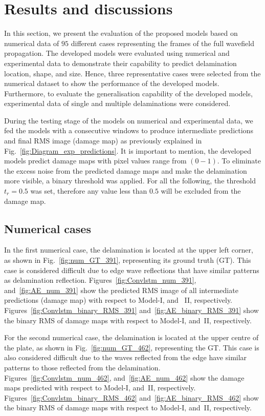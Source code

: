 \section{Results and discussions}
\begin{sloppypar}
	In this section, we present the evaluation of the proposed models based on numerical data of \(95\) different cases representing the frames of the full wavefield propagation. 
	The developed models were evaluated using numerical and experimental data to demonstrate their capability to predict delamination location, shape, and size.	
	Hence, three representative cases were selected from the numerical dataset to show the performance of the developed models.
	Furthermore, to evaluate the generalisation capability of the developed models, experimental data of single and multiple delaminations were considered.
	
	During the testing stage of the models on numerical and experimental data, we fed the models with a consecutive windows to produce intermediate predictions and final RMS image (damage map) as previously explained in Fig.~\ref{fig:Diagram_exp_predictions}.
	It is important to mention, the developed models predict damage maps with pixel values range from \((0-1)\).
	To eliminate the excess noise from the predicted damage maps and make the delamination more visible, a binary threshold was applied.
	For all the following, the threshold $t_r=0.5$ was set, therefore any value less than $0.5$ will be excluded from the damage map.
	
	\subsection{Numerical cases}
	In the first numerical case, the delamination is located at the upper left corner, as shown in Fig.~\ref{fig:num_GT_391}, representing its ground truth (GT).
	This case is considered difficult due to edge wave reflections that have similar patterns as delamination reflection.
	Figures~\ref{fig:Convlstm_num_391}, and~\ref{fig:AE_num_391} show the predicted RMS image of all intermediate predictions (damage map) with respect to Model-I, and~ II, respectively.
	Figures~\ref{fig:Convlstm_binary_RMS_391} and~\ref{fig:AE_binary_RMS_391} show the binary RMS of damage maps with respect to Model-I, and~II, respectively.
	
	For the second numerical case, the delamination is located at the upper centre of the plate, as shown in Fig.~\ref{fig:num_GT_462}, representing the GT.
	This case is also considered difficult due to the waves reflected from the edge have similar patterns to those reflected from the delamination.
	Figures~\ref{fig:Convlstm_num_462}, and~\ref{fig:AE_num_462} show the damage maps predicted with respect to Model-I, and~II, respectively.
	Figures~\ref{fig:Convlstm_binary_RMS_462} and~\ref{fig:AE_binary_RMS_462} show the binary RMS of damage maps with respect to Model-I, and~II, respectively.
	

\end{sloppypar}
